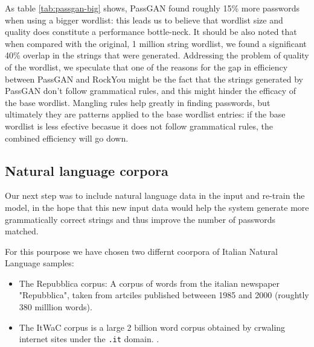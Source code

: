 As table \ref{tab:passgan-big} shows, PassGAN found roughly 15\% more passwords when using a bigger wordlist: this leads us to believe that wordlist size and quality does constitute a performance bottle-neck. It should be also noted that when compared with the original, 1 million string wordlist, we found a significant 40\% overlap in the strings that were generated. Addressing the problem of quality of the wordlist, we speculate that one of the reasons for the gap in efficiency between PassGAN and RockYou might be the fact that the strings generated by PassGAN don't follow grammatical rules, and this might hinder the efficacy of the base wordlist. Mangling rules help greatly in finding passwords, but ultimately they are patterns applied to the base wordlist entries: if the base wordlist is less efective becasue it does not follow grammatical rules, the combined efficiency will go down.

\subsection{Natural language corpora}
Our next step was to include natural language data in the input and re-train the model, in the hope that this new input data would help the system generate more grammatically correct strings and thus improve the number of passwords matched.

For this pourpose we have chosen two differnt coorpora of Italian Natural Language samples: 
\begin{itemize}
    \item The Repubblica corpus: A corpus of words from the italian newspaper "Repubblica", taken from artciles published betweeen 1985 and 2000 (roughtly 380 milllion words).\cite{repubblica_corpus}
    \item The ItWaC corpus is a large 2 billion word corpus obtained by crwaling internet sites under the \texttt{.it} domain. \cite{itwac_corpus}.  
\end{itemize}



